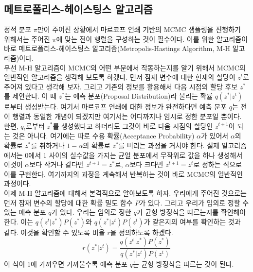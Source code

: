 \documentclass[a4paper]{oblivoir}
\begin{document}
\subsection{메트로폴리스-헤이스팅스 알고리즘}

정적 분포 $\pi$만이 주어진 상황에서 마르코프 연쇄 기반의 MCMC 샘플링을 진행하기 위해서는 주어진 $\pi$에 맞는 전이 행렬을 구성하는 것이 필수이다. 이를 위한 알고리즘이 바로 메트로폴리스-헤이스팅스 알고리즘(Metropolis-Hastings Algorithm, M-H 알고리즘)이다. \\

우선 M-H 알고리즘이 MCMC의 어떤 부분에서 작동하는지를 알기 위해서 MCMC의 일반적인 알고리즘을 생각해 보도록 하겠다. 먼저 잠재 변수에 대한 현재의 할당이 $z^{t}$로 주어져 있다고 생각해 보자. 그리고  기존의 정보를 활용해서 다음 시점의 할당 후보 $z^{*}$를 제안한다. 이 때 $z^{*}$는 예측 분포(Proposal Distribution)라 불리는 확률 $q(z^{*}|z^{t})$로부터 생성받는다. 여기서 마르코프 연쇄에 대한 정보가 완전하다면 예측 분포 $q$는 전이 행렬과 동일한 개념이 되겠지만 여기서는 어디까지나 임시로 정한 분포일 뿐이다. \\

한편, $q_{t}$로부터 $z^{*}$를 생성했다고 하더라도 그것이 바로 다음 시점의 할당인 $z^{t+1}$이 되는 것은 아니다. 여기에는 따로 수용 확률(Acceptance Probability) $\alpha$가 있어서 $\alpha$의 확률로 $z^{*}$를 취하거나 $1-\alpha$의 확률로 $z^{*}$를 버리는 과정을 거쳐야 한다. 실제 알고리즘에서는 0에서 1 사이의 실수값을 가지는 균일 분포에서 무작위로 값을 하나 생성해서 이것이 $\alpha$보다 작거나 같다면 $z^{t+1}=z^{*}$로, $\alpha$보다 크다면 $z^{t+1}=z^{t}$로 정하는 식으로 이를 구현한다. 여기까지의 과정을 계속해서 반복하는 것이 바로 MCMC의 일반적인 과정이다. \\

이제 M-H 알고리즘에 대해서 본격적으로 알아보도록 하자. 우리에게 주어진 것으로는 먼저 잠재 변수의 할당에 대한 확률 밀도 함수 $P$가 있다. 그리고 우리가 임의로 정할 수 있는 예측 분포 $q$가 있다. 우리는 임의로 정한 $q$가 균형 방정식을 따르는지를 확인해야 한다. 이는 $q(z^{t}|z^{*})P(z^{*})$와 $q(z^{*}|z^{t})P(z^{t})$가 같은지의 여부를 확인하는 것과 같다. 이것을 확인할 수 있도록 비율 $r$을 정의하도록 하겠다.
\begin{equation}
r(z^{*}|z^{t}) = \frac{q(z^{t}|z^{*})P(z^{*})}{q(z^{*}|z^{t})P(z^{t})}
\label{eq:10-13}
\end{equation} 
이 식이 1에 가까우면 가까울수록 예측 분포 $q$는 균형 방정식을 따르는 것이 된다. \\
\end{document}
